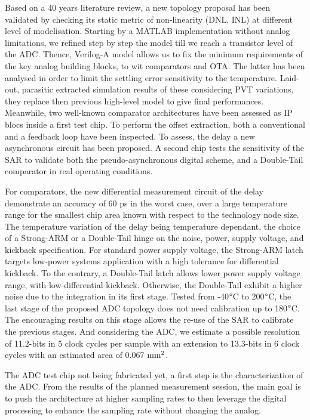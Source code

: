 \begin{mdframed}[linecolor=Prune,linewidth=1]
\begin{small}
Based on a 40 years literature review, a new topology proposal has been validated by checking its static metric of non-linearity (DNL, INL) at different level of modelisation. Starting by a MATLAB implementation without analog limitations, we refined step by step the model till we reach a transistor level of the ADC\@. Thence, Verilog-A model allows us to fix the minimum requirements of the key analog building blocks, to wit comparators and OTA\@. The latter has been analysed in order to limit the settling error sensitivity to the temperature. Laid-out, parasitic extracted simulation results of these considering PVT variations, they replace then previous high-level model to give final performances. Meanwhile, two well-known comparator architectures have been assessed as IP blocs inside a first test chip. To perform the offset extraction, both a conventional and a feedback loop have been inspected. To assess, the delay a new asynchronous circuit has been proposed. A second chip tests the sensitivity of the SAR to validate both the pseudo-asynchronous digital scheme, and a Double-Tail comparator in real operating conditions.

For comparators, the new differential measurement circuit of the delay demonstrate an accuracy of 60 ps in the worst case, over a large temperature range for the smallest chip area known with respect to the technology node size. The temperature variation of the delay being temperature dependant, the choice of a Strong-ARM or a Double-Tail hinge on the noise, power, supply voltage, and kickback specification. For standard power supply voltage, the Strong-ARM latch targets low-power systems application with a high tolerance for differential kickback. To the contrary, a Double-Tail latch allows lower power supply voltage range, with low-differential kickback. Otherwise, the Double-Tail exhibit a higher noise due to the integration in its first stage. Tested from -40$\degree$C to 200$\degree$C, the last stage of the proposed ADC topology does not need calibration up to 180$\degree$C. The encouraging results on this stage allows the re-use of the SAR to calibrate the previous stages. And considering the ADC, we estimate a possible resolution of 11.2-bits in 5 clock cycles per sample with an extension to 13.3-bits in 6 clock cycles with an estimated area of 0.067 $\rm mm^2$.

The ADC test chip not being fabricated yet, a first step is the characterization of the ADC\@. From the results of the planned measurement session, the main goal is to push the architecture at higher sampling rates to then leverage the digital processing to enhance the sampling rate without changing the analog.
\end{small}
\end{mdframed}

